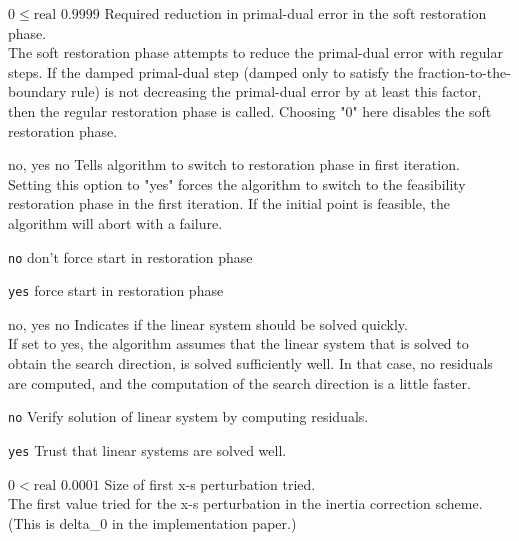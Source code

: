 %
{$0\leq\textrm{real}$}%
{$0.9999$}%
{Required reduction in primal-dual error in the soft restoration phase.\\
The soft restoration phase attempts to reduce the primal-dual error with regular steps. If the damped primal-dual step (damped only to satisfy the fraction-to-the-boundary rule) is not decreasing the primal-dual error by at least this factor, then the regular restoration phase is called. Choosing "0" here disables the soft restoration phase.}%
{}

%
{\ttfamily no, yes}%
{no}%
{Tells algorithm to switch to restoration phase in first iteration.\\
Setting this option to "yes" forces the algorithm to switch to the feasibility restoration phase in the first iteration. If the initial point is feasible, the algorithm will abort with a failure.}%
{\begin{list}{}{
\setlength{\parsep}{0em}
\setlength{\leftmargin}{5ex}
\setlength{\labelwidth}{2ex}
\setlength{\itemindent}{0ex}
\setlength{\topsep}{0pt}}
\item[\texttt{no}] don't force start in restoration phase
\item[\texttt{yes}] force start in restoration phase
\end{list}
}

%
{\ttfamily no, yes}%
{no}%
{Indicates if the linear system should be solved quickly.\\
If set to yes, the algorithm assumes that the linear system that is solved to obtain the search direction, is solved sufficiently well. In that case, no residuals are computed, and the computation of the search direction is a little faster.}%
{\begin{list}{}{
\setlength{\parsep}{0em}
\setlength{\leftmargin}{5ex}
\setlength{\labelwidth}{2ex}
\setlength{\itemindent}{0ex}
\setlength{\topsep}{0pt}}
\item[\texttt{no}] Verify solution of linear system by computing residuals.
\item[\texttt{yes}] Trust that linear systems are solved well.
\end{list}
}

%
{$0<\textrm{real}$}%
{$0.0001$}%
{Size of first x-s perturbation tried.\\
The first value tried for the x-s perturbation in the inertia correction scheme.(This is delta\_0 in the implementation paper.)}%
{}

